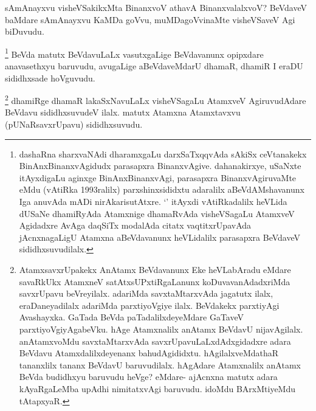 \begin{artha}
sAmAnayxvu visheVSakikxMta BinanxvoV athavA BinanxvalalxvoV? BeVdaveV baMdare sAmAnayxvu KaMDa goVvu, muMDagoVvinaMte visheVSaveV Agi biDuvudu.
\end{artha}


\begin{artha}
\footnote{dashaRna sharxvaNAdi dharamxgaLu darxSaTxqqvAda sAkiSx ceVtanakekx BinAnxBinanxvAgidudx parasapxra BinanxvAgive. dahanakirxye, uSaNxte itAyxdigaLu aginxge BinAnxBinanxvAgi, parasapxra BinanxvAgiruvaMte eMdu (vAtiRka 1993ralilx) parxshinxsididxtu adaralilx aBeVdAMshavanunx Iga anuvAda mADi nirAkarisutAtxre. `\stext' itAyxdi vAtiRkadalilx heVLida dUSaNe dhamiRyAda Atamxnige dhamaRvAda visheVSagaLu AtamxveV Agidadxre AvAga daqSiTx modalAda citatx vaqtitxrUpavAda jAcnxnagaLigU Atamxna aBeVdavanunx heVLidalilx parasapxra BeVdaveV sididhxsuvudilalx.}
BeVda matutx BeVdavuLaLx vasutxgaLige BeVdavanunx opipxdare anavasethxyu baruvudu, avugaLige aBeVdaveMdarU dhamaR, dhamiR I eraDU sididhxsade hoVguvudu.
\end{artha}

\begin{artha}
\footnote{AtamxsavxrUpakekx AnAtamx BeVdavanunx Eke heVLabAradu eMdare savaRkUkx AtamxneV satAtxsUPxtiRgaLanunx koDuvavanAdadxriMda savxrUpavu beVreyilalx. adariMda savxtaMtarxvAda jagatutx ilalx, eraDaneyadilalx adariMda parxtiyoVgiye ilalx. BeVdakekx parxtiyAgi Avashayxka. GaTada BeVda paTadalilxdeyeMdare GaTaveV parxtiyoVgiyAgabeVku. hAge Atamxnalilx anAtamx BeVdavU nijavAgilalx. anAtamxvoMdu savxtaMtarxvAda savxrUpavuLaLxdAdxgidadxre adara BeVdavu Atamxdalilxdeyenanx bahudAgididxtu. hAgilalxveMdathaR tananxlilx tananx BeVdavU baruvudilalx. hAgAdare Atamxnalilx anAtamx BeVda budidhxyu baruvudu heVge? eMdare- ajAcnxna matutx adara kAyaRgaLeMba upAdhi nimitatxvAgi baruvudu. idoMdu BArxMtiyeMdu tAtapxyaR.}
dhamiRge dhamaR lakaSxNavuLaLx visheVSagaLu AtamxveV AgiruvudAdare BeVdavu sididhxsuvudeV ilalx. matutx Atamxna Atamxtavxvu (pUNaRsavxrUpavu) sididhxsuvudu.
\end{artha}



